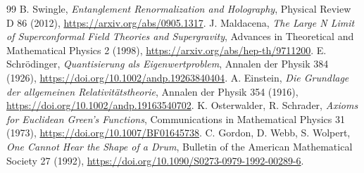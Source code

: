 \documentclass[11pt,a4paper]{article}
\begin{document}
\begin{thebibliography}{99}
 B. Swingle, \emph{Entanglement Renormalization and Holography}, Physical Review D 86 (2012), \url{https://arxiv.org/abs/0905.1317}.
 J. Maldacena, \emph{The Large N Limit of Superconformal Field Theories and Supergravity}, Advances in Theoretical and Mathematical Physics 2 (1998), \url{https://arxiv.org/abs/hep-th/9711200}.
 E. Schrödinger, \emph{Quantisierung als Eigenwertproblem}, Annalen der Physik 384 (1926), \url{https://doi.org/10.1002/andp.19263840404}.
 A. Einstein, \emph{Die Grundlage der allgemeinen Relativitätstheorie}, Annalen der Physik 354 (1916), \url{https://doi.org/10.1002/andp.19163540702}.
 K. Osterwalder, R. Schrader, \emph{Axioms for Euclidean Green's Functions}, Communications in Mathematical Physics 31 (1973), \url{https://doi.org/10.1007/BF01645738}.
 C. Gordon, D. Webb, S. Wolpert, \emph{One Cannot Hear the Shape of a Drum}, Bulletin of the American Mathematical Society 27 (1992), \url{https://doi.org/10.1090/S0273-0979-1992-00289-6}.
\end{thebibliography}
\end{document}
